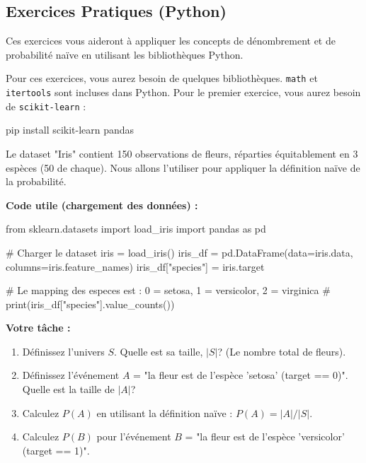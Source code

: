 \subsection{Exercices Pratiques (Python)}

Ces exercices vous aideront à appliquer les concepts de dénombrement et de probabilité naïve en utilisant les bibliothèques Python.

Pour ces exercices, vous aurez besoin de quelques bibliothèques. \texttt{math} et \texttt{itertools} sont incluses dans Python. Pour le premier exercice, vous aurez besoin de \texttt{scikit-learn} :

\begin{codecell}
pip install scikit-learn pandas
\end{codecell}



\begin{exercicebox}
Le dataset "Iris" contient 150 observations de fleurs, réparties équitablement en 3 espèces (50 de chaque). Nous allons l'utiliser pour appliquer la définition naïve de la probabilité.

\textbf{Code utile (chargement des données) :}
\begin{codecell}
from sklearn.datasets import load_iris
import pandas as pd

# Charger le dataset
iris = load_iris()
iris_df = pd.DataFrame(data=iris.data, columns=iris.feature_names)
iris_df["species"] = iris.target

# Le mapping des especes est : 0 = setosa, 1 = versicolor, 2 = virginica
# print(iris_df["species"].value_counts())
\end{codecell}

\textbf{Votre tâche :}
\begin{enumerate}
    \item Définissez l'univers $S$. Quelle est sa taille, $|S|$? (Le nombre total de fleurs).
    \item Définissez l'événement $A$ = "la fleur est de l'espèce 'setosa' (target == 0)". Quelle est la taille de $|A|$?
    \item Calculez $P(A)$ en utilisant la définition naïve : $P(A) = |A| / |S|$.
    \item Calculez $P(B)$ pour l'événement $B$ = "la fleur est de l'espèce 'versicolor' (target == 1)".
\end{enumerate}
\end{exercicebox}



